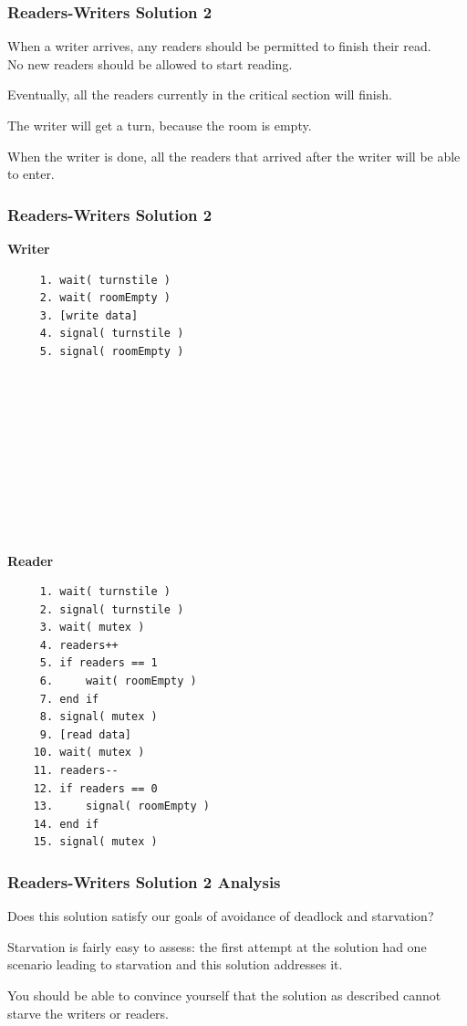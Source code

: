 \begin{frame}
\frametitle{Readers-Writers Solution 2}

When a writer arrives, any readers should be permitted to finish their read.\\
\quad No new readers should be allowed to start reading. 

Eventually, all the readers currently in the critical section will finish. 

The writer will get a turn, because the room is empty.

When the writer is done, all the readers that arrived after the writer will be able to enter.

\end{frame}


\begin{frame}[fragile]
\frametitle{Readers-Writers Solution 2}
\begin{multicols}{2}
\textbf{Writer}
  \begin{verbatim}
	 1. wait( turnstile )
	 2. wait( roomEmpty )
	 3. [write data]
	 4. signal( turnstile )
	 5. signal( roomEmpty )
	 
	 
	 
	 
	 
	 
	 
	 
	 
	 
  \end{verbatim}
\columnbreak
\textbf{Reader}
  \begin{verbatim}
	 1. wait( turnstile )
	 2. signal( turnstile )
	 3. wait( mutex )
	 4. readers++
	 5. if readers == 1
	 6.     wait( roomEmpty )
	 7. end if
	 8. signal( mutex )
	 9. [read data]
	10. wait( mutex )
	11. readers--
	12. if readers == 0
	13.     signal( roomEmpty )
	14. end if
	15. signal( mutex )
  \end{verbatim}
\end{multicols}

\end{frame}


\begin{frame}
\frametitle{Readers-Writers Solution 2 Analysis}

Does this solution satisfy our goals of avoidance of deadlock and starvation? 

Starvation is fairly easy to assess: the first attempt at the solution had one scenario leading to starvation and this solution addresses it. 

You should be able to convince yourself that the solution as described cannot starve the writers or readers.


\end{frame}


